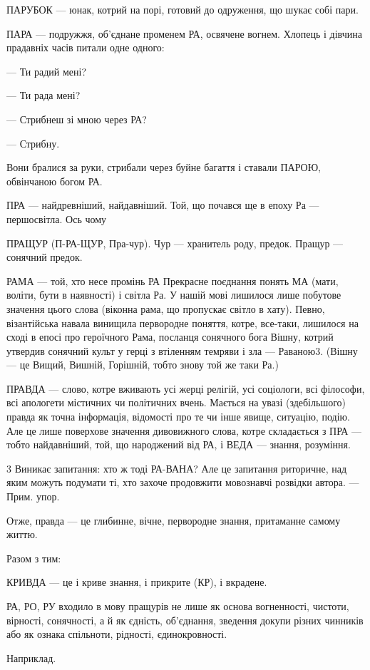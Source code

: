 ПАРУБОК — юнак, котрий на порі, готовий до одруження, що шукає собі пари.

ПАРА — подружжя, об’єднане променем РА, освячене вогнем. Хлопець і дівчина
прадавніх часів питали одне одного:

— Ти радий мені?

— Ти рада мені?

— Стрибнеш зі мною через РА?

— Стрибну.

Вони бралися за руки, стрибали через буйне багаття і ставали ПАРОЮ, обвінчаною
богом РА.

ПРА — найдревніший, найдавніший. Той, що почався ще в епоху Ра — першосвітла. Ось чому

ПРАЩУР (П-РА-ЩУР, Пра-чур). Чур — хранитель роду, предок. Пращур — сонячний предок.

РАМА — той, хто несе промінь РА Прекрасне поєднання понять МА (мати, воліти, бути в наявності) і світла Ра. У нашій мові лишилося лише побутове значення цього слова (віконна рама, що пропускає світло в хату). Певно, візантійська навала винищила первородне поняття, котре, все-таки, лишилося на сході в епосі про героїчного Рама, посланця сонячного бога Вішну, котрий утвердив сонячний культ у герці з втіленням темряви і зла — Раваною3. (Вішну — це Вищий, Вишній, Горішній, тобто знову той же таки Ра.)

ПРАВДА — слово, котре вживають усі жерці релігій, усі соціологи, всі філософи, всі апологети містичних чи політичних вчень. Мається на увазі (здебільшого) правда як точна інформація, відомості про те чи інше явище, ситуацію, подію. Але це лише поверхове значення дивовижного слова, котре складається з ПРА — тобто найдавніший, той, що народжений від РА, і ВЕДА — знання, розуміння.

3 Виникає запитання: хто ж тоді РА-ВАНА? Але це запитання риторичне, над яким можуть подумати ті, хто захоче продовжити мовознавчі розвідки автора. — Прим. упор.

Отже, правда — це глибинне, вічне, первородне знання, притаманне самому життю.

Разом з тим:

КРИВДА — це і криве знання, і прикрите (КР), і вкрадене.

РА, РО, РУ входило в мову пращурів не лише як основа вогненності, чистоти,
вірності, сонячності, а й як єдність, об’єднання, зведення докупи різних
чинників або як ознака спільноти, рідності, єдинокровності.

Наприклад.

